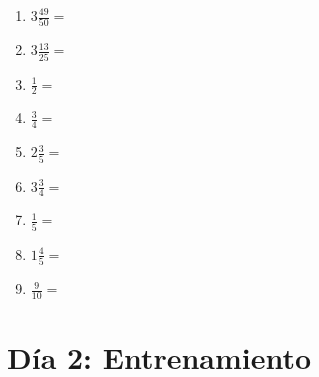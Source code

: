 \documentclass[12pt]{article}
\begin{document}
\begin{enumerate}
\item \large $ 3 \frac{49}{50} = $ \vspace{1.5cm}
\item \large $ 3 \frac{13}{25} = $ \vspace{1.5cm}
\item \large $ \frac{1}{2} = $ \vspace{1.5cm}
\item \large $ \frac{3}{4} = $ \vspace{1.5cm}
\item \large $ 2 \frac{3}{5} = $ \vspace{1.5cm}
\item \large $ 3 \frac{3}{4} = $ \vspace{1.5cm}
\item \large $ \frac{1}{5} = $ \vspace{1.5cm}
\item \large $ 1 \frac{4}{5} = $ \vspace{1.5cm}
\item \large $ \frac{9}{10} = $ \vspace{1.5cm}
\end{enumerate}\newpage
\section*{Día 2: Entrenamiento}
\end{document}
